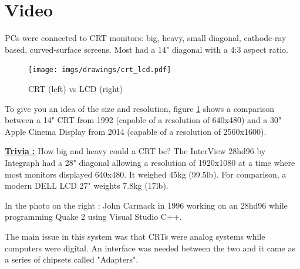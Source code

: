 \documentclass[book.tex]{subfiles}
\begin{document}
\section{Video}

PCs were connected to CRT monitors: big, heavy, small diagonal, cathode-ray based, curved-surface screens. Most had a 14" diagonal with a 4:3 aspect ratio.\\
\par


\begin{figure}[H]
\centering
\texttt{[image: imgs/drawings/crt\_lcd.pdf]}
\caption{CRT (left) vs LCD (right)}
\label{fig:lcd_vs_crt}
\end{figure}
\par
  To give you an idea of the size and resolution, figure \ref{fig:lcd_vs_crt} shows a comparison between a 14" CRT from 1992 (capable of a resolution of 640x480) and a 30" Apple Cinema Display from 2014 (capable of a resolution of 2560x1600).\\
  \par
{}



\begin{minipage}{.4\textwidth}
\textbf{\underline{Trivia :}} How big and heavy could a CRT be? The InterView 28hd96 by Integraph had a 28" diagonal allowing a resolution of 1920x1080 at a time where most monitors displayed 640x480. It weighed 45kg (99.5lb). For comparison, a modern DELL LCD 27" weights 7.8kg (17lb).\\
\par
In the photo on the right : John Carmack in 1996 working on an 28hd96 while programming Quake 2 using Visual Studio C++.\\
\end{minipage}
\begin{minipage}{.6\textwidth}
\begin{figure}[H]
  \begin{flushright}
       \vspace{-10pt}
    \end{flushright}
\end{figure}
\end{minipage}

\par
The main issue in this system was that CRTs were analog systems while computers were digital. An interface was needed between the two and it came as a series of chipsets called "Adapters". 
\end{document}
